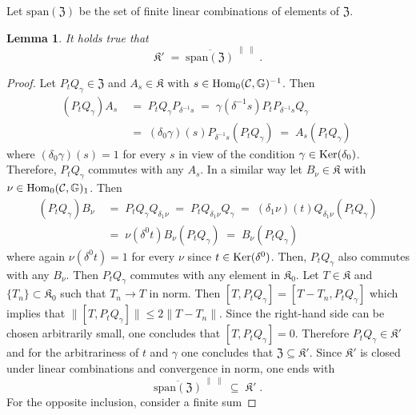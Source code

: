 \documentclass[a4paper,12pt,twoside,reqno]{amsart}
\theoremstyle{plain}
\newtheorem{lemma}[teo]{Lemma}
\theoremstyle{definition}
\theoremstyle{remark}
\numberwithin{equation}{section}
\numberwithin{figure}{section}
\numberwithin{table}{section}
\newcommand{\f}[1]{\mathcal{#1}}
\newcommand{\n}[1]{\mathbb{#1}}
\begin{document}
	Let $\mathrm{span}(\mathfrak{Z})$ be the set of finite linear combinations of elements of $\mathfrak{Z}$. 
	\begin{lemma}\label{Lem:span-K'}
		It holds true that
		\[
		\mathfrak{K}'\;=\;\overline{\mathrm{span}(\mathfrak{Z})}^{\;\|\;\|}\;.
		\]
	\end{lemma}
	\begin{proof}
		Let $P_tQ_\gamma\in \mathfrak{Z}$ and $A_s\in\mathfrak{K}$ with  $s\in {\rm Hom}_0(\f{C},\n{G})^{-1}$. Then
		\begin{equation}\label{eq:aux_1}
			\begin{aligned}
				(P_tQ_\gamma)A_s\;&=\;P_tQ_\gamma P_{\delta^{-1}s}\;=\;\gamma(\delta^{-1}s)P_tP_{\delta^{-1}s}Q_\gamma\\
				&=\;(\delta_0\gamma)(s)P_{\delta^{-1}s}(P_tQ_\gamma)\;=\;A_s(P_tQ_\gamma)\;
			\end{aligned}
		\end{equation}
		where $(\delta_0\gamma)(s)=1$ for every $s$ in view of  the condition $\gamma\in{\rm Ker}(\delta_0)$. Therefore, $P_tQ_\gamma$ commutes with any $A_s$. In a similar way let  $B_\nu\in\mathfrak{K}$ with $\nu\in {\rm Hom}_0(\f{C},\n{G})_{1}$. Then
		\begin{equation}\label{eq:aux_2}
			\begin{aligned}
				(P_tQ_\gamma)B_\nu\;&=\;P_tQ_\gamma Q_{\delta_{1}\nu}\;=\;P_tQ_{\delta_{1}\nu}Q_\gamma
				\;=\;(\delta_{1}\nu)(t)Q_{\delta_{1}\nu}(P_tQ_\gamma)\\
				&=\;\nu(\delta^0 t)B_\nu(P_tQ_\gamma)\;=\;B_\nu(P_tQ_\gamma)
			\end{aligned}
		\end{equation}
		where again $\nu(\delta^0 t)=1$ for every $\nu$ since 
		$t\in{\rm Ker}(\delta^0)$. Then, $P_tQ_\gamma$ also commutes with any $B_\nu$. Then $P_tQ_\gamma$ commutes with any element in $\mathfrak{K}_0$. Let $T\in \mathfrak{K}$ and $\{T_n\}\subset \mathfrak{K}_0$ such that $T_n\to T$ in norm. Then $[T,P_tQ_\gamma]=[T-T_n,P_tQ_\gamma]$
		which implies that $\|[T,P_tQ_\gamma]\|\leqslant 2 \|T-T_n\|$. Since the right-hand side can be chosen arbitrarily small, one concludes that 
		$[T,P_tQ_\gamma]=0$.
		Therefore $P_tQ_\gamma\in \mathfrak{K}'$ and for the arbitrariness 
		of $t$ and $\gamma$ one concludes that $\mathfrak{Z}\subseteq \mathfrak{K}'$. Since $\mathfrak{K}'$ is closed under linear combinations and convergence in norm, one ends with  
		\[
		\overline{\mathrm{span}(\mathfrak{Z})}^{\;\|\;\|}\;\subseteq \;\mathfrak{K}'\;.
		\]
		For the opposite inclusion, consider a finite sum

\end{proof}
\end{document}
